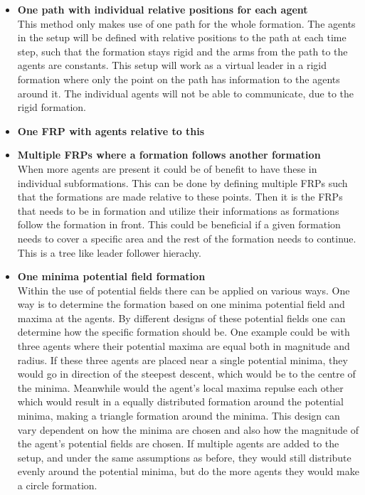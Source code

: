\begin{itemize}
\begin{itemize}
	\end{itemize}
\item \textbf{One path with individual relative positions for each agent}\\
This method only makes use of one path for the whole formation. The agents in the setup will be defined with relative positions to the path at each time step, such that the formation stays rigid and the arms from the path to the agents are constants. This setup will work as a virtual leader in a rigid formation where only the point on the path has information to the agents around it. The individual agents will not be able to communicate, due to the rigid formation.
\item \textbf{One \ac{FRP} with agents relative to this}\\
\item \textbf{Multiple \ac{FRP}s where a formation follows another formation}\\
When more agents are present it could be of benefit to have these in individual subformations. This can be done by defining multiple \ac{FRP}s such that the formations are made relative to these points. Then it is the \ac{FRP}s that needs to be in formation and utilize their informations as formations follow the formation in front. This could be beneficial if a given formation needs to cover a specific area and the rest of the formation needs to continue. This is a tree like leader follower hierachy.
\item \textbf{One minima potential field formation}\\
Within the use of potential fields there can be applied on various ways. One way is to determine the formation based on one minima potential field and maxima at the agents. By different designs of these potential fields one can determine how the specific formation should be. One example could be with three agents where their potential maxima are equal both in magnitude and radius. If these three agents are placed near a single potential minima, they would go in direction of the steepest descent, which would be to the centre of the minima. Meanwhile would the agent's local maxima repulse each other which would result in a equally distributed formation around the potential minima, making a triangle formation around the minima.
This design can vary dependent on how the minima are chosen and also how the magnitude of the agent's potential fields are chosen. If multiple agents are added to the setup, and under the same assumptions as before, they would still distribute evenly around the potential minima, but do the more agents they would make a circle formation. 

\end{itemize}
